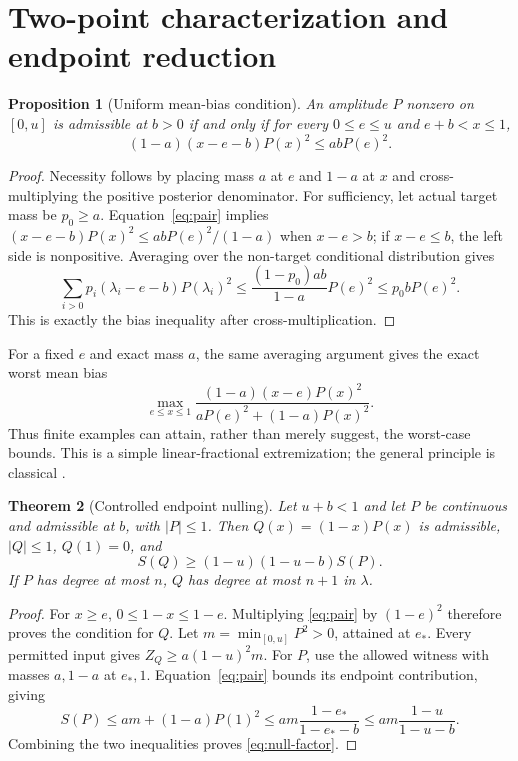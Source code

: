 \documentclass[11pt]{article}
\newtheorem{theorem}{Theorem}
\newtheorem{proposition}[theorem]{Proposition}
\begin{document}
\section{Two-point characterization and endpoint reduction}
\begin{proposition}[Uniform mean-bias condition]\label{prop:pair}
An amplitude $P$ nonzero on $[0,u]$ is admissible at $b>0$ if and only if
for every $0\leq e\leq u$ and $e+b<x\leq1$,
\begin{equation}\label{eq:pair}
 (1-a)(x-e-b)P(x)^2\leq abP(e)^2.
\end{equation}
\end{proposition}
\begin{proof}
Necessity follows by placing mass $a$ at $e$ and $1-a$ at $x$ and
cross-multiplying the positive posterior denominator. For sufficiency,
let actual target mass be $p_0\geq a$. Equation~\eqref{eq:pair} implies
$(x-e-b)P(x)^2\leq abP(e)^2/(1-a)$ when $x-e>b$; if $x-e\leq b$, the
left side is nonpositive. Averaging over the non-target conditional
distribution gives
\[
 \sum_{i>0}p_i(\lambda_i-e-b)P(\lambda_i)^2
 \leq \frac{(1-p_0)ab}{1-a}P(e)^2
 \leq p_0bP(e)^2.
\]
This is exactly the bias inequality after cross-multiplication.
\end{proof}

For a fixed $e$ and exact mass $a$, the same averaging argument gives the
exact worst mean bias
\begin{equation}\label{eq:two-point}
 \max_{e\leq x\leq1}
 \frac{(1-a)(x-e)P(x)^2}{aP(e)^2+(1-a)P(x)^2}.
\end{equation}
Thus finite examples can attain, rather than merely suggest, the
worst-case bounds. This is a simple linear-fractional extremization;
the general principle is classical \cite{Charnes}.

\begin{theorem}[Controlled endpoint nulling]\label{thm:null}
Let $u+b<1$ and let $P$ be continuous and admissible at $b$, with $|P|\leq1$.
Then $Q(x)=(1-x)P(x)$ is admissible, $|Q|\leq1$, $Q(1)=0$, and
\begin{equation}\label{eq:null-factor}
 S(Q)\geq (1-u)(1-u-b)S(P).
\end{equation}
If $P$ has degree at most $n$, $Q$ has degree at most $n+1$ in $\lambda$.
\end{theorem}
\begin{proof}
For $x\geq e$, $0\leq1-x\leq1-e$. Multiplying
\eqref{eq:pair} by $(1-e)^2$ therefore proves the condition for $Q$.
Let $m=\min_{[0,u]}P^2>0$, attained at $e_*$. Every permitted input gives
$Z_Q\geq a(1-u)^2m$.
For $P$, use the allowed witness with masses $a,1-a$ at $e_*,1$.
Equation~\eqref{eq:pair} bounds its endpoint contribution, giving
\[
 S(P)\leq am+(1-a)P(1)^2
 \leq am\frac{1-e_*}{1-e_*-b}
 \leq am\frac{1-u}{1-u-b}.
\]
Combining the two inequalities proves \eqref{eq:null-factor}.
\end{proof}
\end{document}
